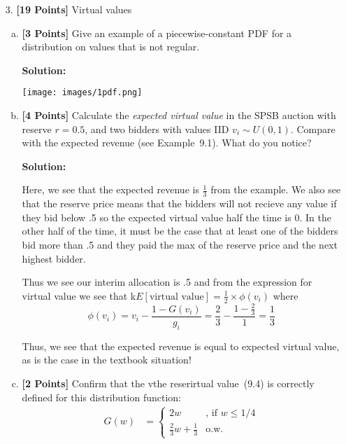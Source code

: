 \documentclass[11pt]{article}
\newcommand{\points}[1]{\textbf{[#1 Points]}}
\begin{document}
\begin{enumerate}[1.]
\begin{enumerate}[(a)]
\end{enumerate}

\item[3.] \points{19} Virtual values

\begin{enumerate}[(a)]

\item \points{3}  Give an example of a piecewise-constant PDF
for a distribution on values that is not regular.

\textbf{Solution:}

\texttt{[image: images/1pdf.png]}


%

\item \points{4} Calculate the {\em expected virtual value} in the
  SPSB auction with reserve $r=0.5$, and two bidders with values IID
  $v_i\sim U(0,1)$. Compare with the expected revenue (see Example~9.1).
What do you notice?

\textbf{Solution:}

Here, we see that the expected revenue is $\frac{1}{3}$ from the example.  We also see that the reserve price means that the bidders will not recieve any value if they bid below .5 so the expected virtual value half the time is 0.  In the other half of the time, it must be the case that at least one of the bidders bid more than .5 and they paid the max of
the reserve price and the next highest bidder.

Thus we see our interim allocation is .5 and from the expression for virtual value we see that k$E[\text{virtual value}] = \frac{1}{2} \times \phi(v_i)$ where $$\phi(v_i) = v_i - \frac{1-G(v_i)}{g_i} = \frac{2}{3} - \frac{1-\frac{2}{3}}{1} = \frac{1}{3}$$

Thus, we see that the expected revenue is equal to expected virtual value, as is the case in the textbook situation!



\item \points{2} Confirm that the vthe reserirtual value~(9.4) is correctly
  defined for this distribution function:
%
\begin{align}
  G(w)&=\left\{
  \begin{array}{ll}
    2w & \mbox{,  if $w\leq 1/4$}
    \\
    \frac{2}{3}w+\frac{1}{3} &\mbox{o.w.}
  \end{array}
  \right.
\end{align}

%


\end{enumerate}
\end{enumerate}
\end{document}
